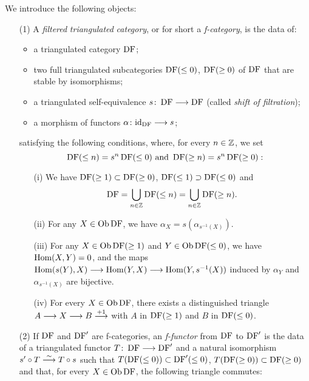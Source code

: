 \begin{definition}
\label{def-FilteredTriangulated}
We introduce the following objects:
\begin{itemize}
\item[(1)] A \textit{filtered} \textit{triangulated} \textit{category}, or for short a \emph{f-category}, is the data of:
\begin{itemize}
\item a triangulated category $\operatorname{DF}$;
\item two full triangulated subcategories $\operatorname{DF}(\leq 0)$, $\operatorname{DF}(\geq 0)$ of $\operatorname{DF}$ that are stable by isomorphisms;
\item a triangulated self-equivalence $s\colon \operatorname{DF}\longrightarrow\operatorname{DF}$ (called \emph{shift of filtration});
\item a morphism of functors $\alpha\colon \mathrm{id}_{\operatorname{DF}}\longrightarrow s$;

\end{itemize}
satisfying the following conditions, where, for every $n\in\mathbb{Z}$, we set
\[\operatorname{DF}(\leq n)=s^n\operatorname{DF}(\leq 0)\mbox{ and }\operatorname{DF}(\geq n)=s^n\operatorname{DF}(\geq 0):\]
\begin{itemize}
\item[(i)] We have $\operatorname{DF}(\geq 1)\subset\operatorname{DF}(\geq 0)$, $\operatorname{DF}(\leq 1)\supset\operatorname{DF}(\leq 0)$ and
\[\operatorname{DF}=\bigcup_{n\in\mathbb{Z}}\operatorname{DF}(\leq n)=\bigcup_{n\in\mathbb{Z}}\operatorname{DF}(\geq n).\]
\item[(ii)] For any $X\in\operatorname{\mathrm{Ob}}\operatorname{DF}$, we have $\alpha_X=s(\alpha_{s^{-1}(X)})$.
\item[(iii)] For any $X\in\operatorname{\mathrm{Ob}}\operatorname{DF}(\geq 1)$ and $Y\in\operatorname{\mathrm{Ob}}\operatorname{DF}(\leq 0)$, we have $\operatorname{Hom}(X,Y)=0$, and the maps $\operatorname{Hom}(s(Y),X)\longrightarrow\operatorname{Hom}(Y,X)\longrightarrow\operatorname{Hom}(Y,s^{-1}(X))$ induced
by $\alpha_Y$ and $\alpha_{s^{-1}(X)}$ are bijective.
\item[(iv)] For every $X\in\operatorname{\mathrm{Ob}}\operatorname{DF}$, there exists a distinguished triangle $A\longrightarrow X\longrightarrow B\stackrel{+1}{\longrightarrow}$ with $A$ in $\operatorname{DF}(\geq 1)$ and $B$ in $\operatorname{DF}(\leq 0)$.
\end{itemize}

\item[(2)] If $\operatorname{DF}$ and $\operatorname{DF}'$ are f-categories, an \emph{f-functor} from $\operatorname{DF}$ to $\operatorname{DF}'$ is the data of a triangulated functor $T\colon \operatorname{DF}\longrightarrow\operatorname{DF}'$ and a natural isomorphism
$s'\circ T\stackrel{\sim}{\longrightarrow} T\circ s$ 
such that $T(\operatorname{DF}(\leq 0))\subset\operatorname{DF}'(\leq 0)$,
$T(\operatorname{DF}(\geq 0))\subset\operatorname{DF}(\geq 0)$ and that, for every $X\in\operatorname{\mathrm{Ob}}\operatorname{DF}$, the following triangle commutes:



\end{itemize}
\end{definition}
